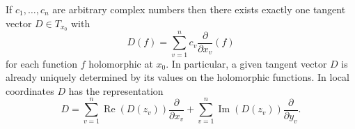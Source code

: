 If $c_1, \ldots, c_n$ are arbitrary complex numbers then there exists exactly one tangent vector $D \in T_{x_0}$ with
$$D(f) = \sum_{v=1}^{n} c_v \frac{\partial}{\partial x_v}(f)$$
for each function $f$ holomorphic at $x_0$. In particular, a given tangent vector $D$ is already uniquely determined by its values on the holomorphic functions. In local coordinates $D$ has the representation
$$D = \sum_{v=1}^{n} \operatorname{Re}(D(z_v)) \frac{\partial}{\partial x_v} + \sum_{v=1}^{n} \operatorname{Im}(D(z_v)) \frac{\partial}{\partial y_v}.$$

